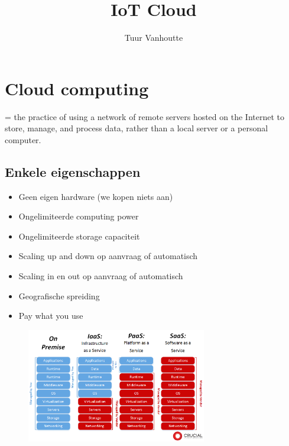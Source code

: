 \documentclass{article}
\begin{document}
\begin{titlepage}
    \author{Tuur Vanhoutte}
    \title{IoT Cloud}
\end{titlepage}

\maketitle
\newpage
\tableofcontents
\newpage


\section{Cloud computing}

= the practice of using a network of remote servers hosted on the Internet to store, manage, and process data, rather than a local server or a personal computer.

\subsection{Enkele eigenschappen}
\begin{itemize}
    \item Geen eigen hardware (we kopen niets aan)
    \item Ongelimiteerde computing power
    \item Ongelimiteerde storage capaciteit
    \item Scaling up and down op aanvraag of
    automatisch
    \item Scaling in en out op aanvraag of
    automatisch
    \item Geografische spreiding
    \item Pay what you use
\end{itemize}

\begin{figure}[H]
    \centering
    \includegraphics[width=0.7\textwidth]{cloud-hosting.png}
    \caption{}
\end{figure}
\end{document}
